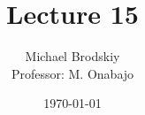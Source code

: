 


\title{Lecture 15}
\date{\today}
\author{Michael Brodskiy\\ \small Professor: M. Onabajo}



\maketitle

